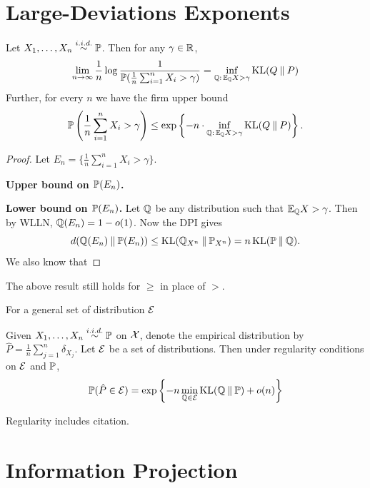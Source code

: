 \section{Large-Deviations Exponents}
\begin{theorem}
    Let $X_1,\dots,X_n\stackrel{i.i.d.}{\sim} \mathbb{P}$.
    Then for any $\gamma\in\mathbb{R}$,
    \begin{equation*}
        \lim_{n\to\infty}\frac{1}{n}\log \frac{1}{\mathbb{P}(\frac{1}{n}\sum_{i=1}^{n}X_i>\gamma)}=\inf_{\mathbb{Q}:\,\mathbb{E}_{\mathbb{Q}} X>\gamma}\operatorname{KL}(Q\mathbin{\|} P)
    \end{equation*}
    Further, for every $n$ we have the firm upper bound 
    \begin{equation*}
        \mathbb{P}\left(\frac{1}{n}\sum_{i=1}^{n}X_i>\gamma\right)\leq \exp\left\{-n\cdot \inf_{\mathbb{Q}:\,\mathbb{E}_{\mathbb{Q}} X>\gamma}\operatorname{KL}(Q\mathbin{\|} P)\right\}.
    \end{equation*}
\end{theorem}
\begin{proof}
    Let $E_n=\{ \frac{1}{n}\sum_{i=1}^{n}X_i>\gamma \}$.

    \textbf{Upper bound on $\mathbb{P}(E_n)$.}

    \textbf{Lower bound on $\mathbb{P}(E_n)$.} Let $\mathbb{Q}$ be any distribution such that $\mathbb{E}_{\mathbb{Q}} X>\gamma$. Then by WLLN, $\mathbb{Q}(E_n)=1-o(1)$.
    Now the DPI gives 
    \[d(\mathbb{Q}(E_n)\mathbin{\|} \mathbb{P}(E_n))\leq \operatorname{KL}(\mathbb{Q}_{X^n}\mathbin{\|} \mathbb{P}_{X^n})=n\operatorname{KL}(\mathbb{P}\mathbin{\|} \mathbb{Q}).\]
    We also know that 
\end{proof}
\begin{corollary}
    The above result still holds for $\geq$ in place of $>$.
\end{corollary}

For a general set of distribution $\mathcal{E}$
\begin{theorem}
    Given $X_1,\dots,X_n\stackrel{i.i.d.}{\sim} \mathbb{P}$ on $\mathcal{X}$, denote the empirical distribution by $\hat{P}=\frac{1}{n}\sum_{j=1}^{n}\delta_{X_j}$.
    Let $\mathcal{E}$ be a set of distributions. Then under regularity conditions on $\mathcal{E}$ and $\mathbb{P}$,
\begin{equation*}
    \mathbb{P}(\hat{P}\in\mathcal{E})=\exp\left\{-n\min_{\mathbb{Q}\in\mathcal{E}}\operatorname{KL}(\mathbb{Q}\mathbin{\|}\mathbb{P})+o(n)\right\}
\end{equation*}
\end{theorem}
Regularity includes citation.

\section{Information Projection}


